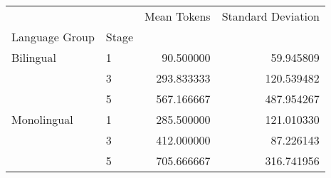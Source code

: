 \begin{tabular}{llrr}
\toprule
            &   &  Mean Tokens &  Standard Deviation \\
Language Group & Stage &              &                     \\
\midrule
Bilingual & 1 &    90.500000 &           59.945809 \\
            & 3 &   293.833333 &          120.539482 \\
            & 5 &   567.166667 &          487.954267 \\
Monolingual & 1 &   285.500000 &          121.010330 \\
            & 3 &   412.000000 &           87.226143 \\
            & 5 &   705.666667 &          316.741956 \\
\bottomrule
\end{tabular}
